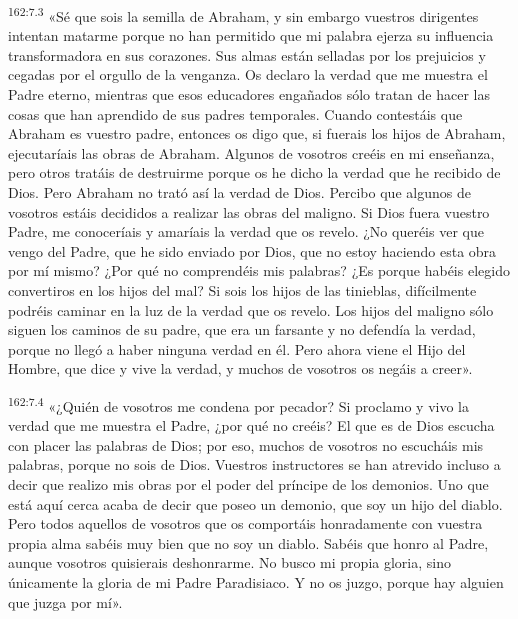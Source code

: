 \par 
\textsuperscript{162:7.3} «Sé que sois la semilla de Abraham, y sin embargo vuestros dirigentes intentan matarme porque no han permitido que mi palabra ejerza su influencia transformadora en sus corazones. Sus almas están selladas por los prejuicios y cegadas por el orgullo de la venganza. Os declaro la verdad que me muestra el Padre eterno, mientras que esos educadores engañados sólo tratan de hacer las cosas que han aprendido de sus padres temporales. Cuando contestáis que Abraham es vuestro padre, entonces os digo que, si fuerais los hijos de Abraham, ejecutaríais las obras de Abraham. Algunos de vosotros creéis en mi enseñanza, pero otros tratáis de destruirme porque os he dicho la verdad que he recibido de Dios. Pero Abraham no trató así la verdad de Dios. Percibo que algunos de vosotros estáis decididos a realizar las obras del maligno. Si Dios fuera vuestro Padre, me conoceríais y amaríais la verdad que os revelo. ¿No queréis ver que vengo del Padre, que he sido enviado por Dios, que no estoy haciendo esta obra por mí mismo? ¿Por qué no comprendéis mis palabras? ¿Es porque habéis elegido convertiros en los hijos del mal? Si sois los hijos de las tinieblas, difícilmente podréis caminar en la luz de la verdad que os revelo. Los hijos del maligno sólo siguen los caminos de su padre, que era un farsante y no defendía la verdad, porque no llegó a haber ninguna verdad en él. Pero ahora viene el Hijo del Hombre, que dice y vive la verdad, y muchos de vosotros os negáis a creer».

\par 
\textsuperscript{162:7.4} «¿Quién de vosotros me condena por pecador? Si proclamo y vivo la verdad que me muestra el Padre, ¿por qué no creéis? El que es de Dios escucha con placer las palabras de Dios; por eso, muchos de vosotros no escucháis mis palabras, porque no sois de Dios. Vuestros instructores se han atrevido incluso a decir que realizo mis obras por el poder del príncipe de los demonios. Uno que está aquí cerca acaba de decir que poseo un demonio, que soy un hijo del diablo. Pero todos aquellos de vosotros que os comportáis honradamente con vuestra propia alma sabéis muy bien que no soy un diablo. Sabéis que honro al Padre, aunque vosotros quisierais deshonrarme. No busco mi propia gloria, sino únicamente la gloria de mi Padre Paradisiaco. Y no os juzgo, porque hay alguien que juzga por mí».

